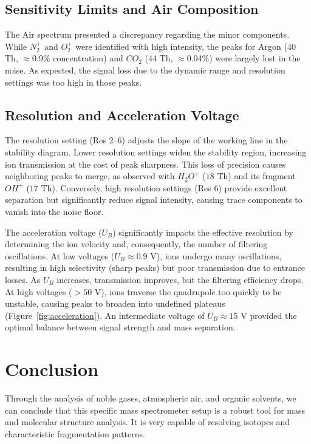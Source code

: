\documentclass[a4paper]{article}
\begin{document}
\subsection{Sensitivity Limits and Air Composition}
The Air spectrum presented a discrepancy regarding the minor components. While $N_2^+$ and $O_2^+$ were identified with high intensity, the peaks for Argon (40 Th, $\approx$0.9\% concentration) and $CO_2$ (44 Th, $\approx$0.04\%) were largely lost in the noise. As expected, the signal loss due to the dynamic range and resolution settings was too high in those peaks.

\subsection{Resolution and Acceleration Voltage}
The resolution setting (Res 2--6) adjusts the slope of the working line in the stability diagram. Lower resolution settings widen the stability region, increasing ion transmission at the cost of peak sharpness. This loss of precision causes neighboring peaks to merge, as observed with $H_2O^+$ ($18$ Th) and its fragment $OH^+$ ($17$ Th). Conversely, high resolution settings (Res 6) provide excellent separation but significantly reduce signal intensity, causing trace components to vanish into the noise floor.

The acceleration voltage ($U_B$) significantly impacts the effective resolution by determining the ion velocity and, consequently, the number of filtering oscillations. At low voltages ($U_B \approx 0.9$ V), ions undergo many oscillations, resulting in high selectivity (sharp peaks) but poor transmission due to entrance losses. As $U_B$ increases, transmission improves, but the filtering efficiency drops. At high voltages ($>50$ V), ions traverse the quadrupole too quickly to be unstable, causing peaks to broaden into undefined plateaus (Figure~\ref{fig:acceleration}). An intermediate voltage of $U_B \approx 15$ V provided the optimal balance between signal strength and mass separation.

\section{Conclusion}
Through the analysis of noble gases, atmospheric air, and organic solvents, we can conclude that this specific mass spectrometer setup is a robust tool for mass and molecular structure analysis. It is very capable of resolving isotopes and characteristic fragmentation patterns.
\end{document}
